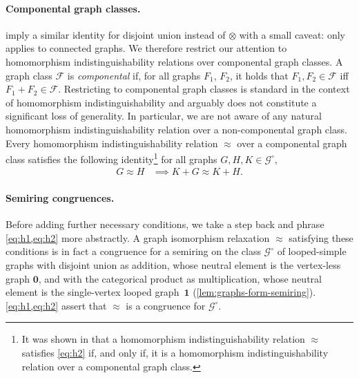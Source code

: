 \documentclass[11pt]{scrartcl}
\theoremstyle{definition}
\theoremstyle{plain}
\theoremstyle{remark}
\newcommand{\lG}{\mathcal{G}^\circ}
\begin{document}
	\paragraph{Componental graph classes.}
	 imply a similar identity for disjoint union instead of $\otimes$ with a small caveat:
	 only applies to connected graphs.
	We therefore restrict our attention to homomorphism indistinguishability relations over componental graph classes.
	A graph class $\mathcal{F}$ is \emph{componental} if, for all graphs $F_1$, $F_2$, it holds that $F_1, F_2 \in \mathcal{F}$ iff $F_1 + F_2 \in \mathcal{F}$.
	Restricting to componental graph classes is standard in the context of homomorphism indistinguishability \cite{roberson_oddomorphisms_2022,abramsky_discrete_2022,seppelt_logical_2024}
	and arguably does not constitute a significant loss of generality.
	In particular, we are not aware of any natural homomorphism indistinguishability relation over a non-componental graph class.
    Every homomorphism indistinguishability relation $\approx$ over a componental graph class 
	satisfies the following identity\footnote{It was shown in \cite[Theorem~7]{seppelt_logical_2024} that a homomorphism indistinguishability relation $\approx$ satisfies \eqref{eq:h2} if, and only if, it is a homomorphism indistinguishability relation over a componental graph class.}
	 for all graphs $G, H, K \in \lG$,
	\begin{align}
		\label{eq:h2}
		G \approx H &\implies K + G \approx K + H.
	\end{align}

	\paragraph{Semiring congruences.}
	Before adding further necessary conditions, we take a step back and phrase \cref{eq:h1,eq:h2} more abstractly.
	A graph isomorphism relaxation $\approx$ satisfying these conditions is in fact a congruence for a semiring on the class $\lG$ of looped-simple graphs with disjoint union as addition, whose neutral element is the vertex-less graph $\boldsymbol{0}$,
	and with the categorical product as multiplication, whose neutral element is the single-vertex looped graph~$\boldsymbol{1}$ (\cref{lem:graphs-form-semiring}).
	\cref{eq:h1,eq:h2} assert that $\approx$ is a congruence for $\lG$.
\end{document}
